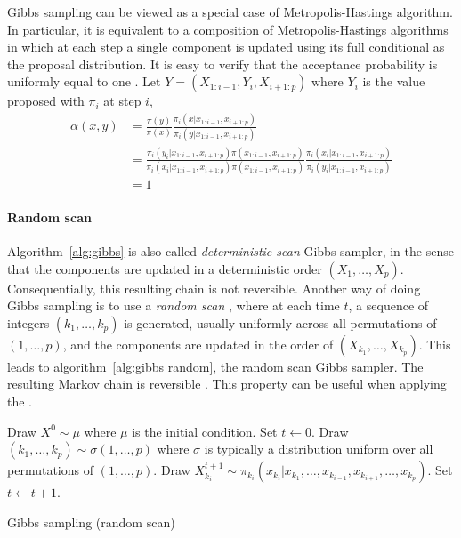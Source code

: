 Gibbs sampling can be viewed as a special case of Metropolis-Hastings
algorithm. In particular, it is equivalent to a composition of
Metropolis-Hastings algorithms in which at each step a single component is
updated using its full conditional as the proposal distribution. It is easy to
verify that the acceptance probability is uniformly equal to one
\cite[][Theorem~10.13]{Robert:2004tn}. Let $Y = (X_{1:i-1},Y_i,X_{i+1:p})$
where $Y_i$ is the value proposed with $\pi_i$ at step $i$,
\begin{align*}
  \alpha(x,y) &= \frac{\pi(y)}{\pi(x)}
  \frac{\pi_i(x|x_{1:i-1},x_{i+1:p})}{\pi_i(y|x_{1:i-1},x_{i+1:p})} \\
  &= \frac{\pi_i(y_i|x_{1:i-1}, x_{i+1:p})\pi(x_{1:i-1},x_{i+1:p})}
  {\pi_i(x_i|x_{1:i-1}, x_{i+1:p})\pi(x_{1:i-1},x_{i+1:p})}
  \frac{\pi_i(x_i|x_{1:i-1}, x_{i+1:p})}{\pi_i(y_i|x_{1:i-1}, x_{i+1:p})} \\
  &= 1
\end{align*}

\paragraph{Random scan}

Algorithm~\ref{alg:gibbs} is also called \emph{deterministic scan} Gibbs
sampler, in the sense that the components are updated in a deterministic order
$(X_1,\dots,X_p)$. Consequentially, this resulting chain is not reversible.
Another way of doing Gibbs sampling is to use a \emph{random scan}
\cite{Liu1995Gibbs}, where at each time $t$, a sequence of integers
$(k_1,\dots,k_p)$ is generated, usually uniformly across all permutations of
$(1,\dots,p)$, and the components are updated in the order of
$(X_{k_1},\dots,X_{k_p})$. This leads to algorithm~\ref{alg:gibbs random}, the
random scan Gibbs sampler. The resulting Markov chain is reversible
\cite{Liu1995Gibbs}. This property can be useful when applying the \clt
\cite[][sec.~10.1.2]{Robert:2004tn}.

\begin{algorithm}
\begin{algorithmic}
  \tophrule
  \STATE Draw $X^0\sim\mu$ where $\mu$ is the initial condition.
  \STATE Set $t\leftarrow0$.
  \REPEAT
    \STATE Draw $(k_1,\dots,k_p)\sim\sigma(1,\dots,p)$ where $\sigma$ is
    typically a distribution uniform over all permutations of $(1,\dots,p)$.
      \STATE Draw
      $X_{k_i}^{t+1}\sim
      \pi_{k_i}(x_{k_i}|x_{k_1},\dots,x_{k_{i-1}},x_{k_{i+1}},\dots,x_{k_p})$.
    \ENDFOR
    \STATE Set $t\leftarrow t+1$.
  \bottomhrule
\end{algorithmic}
\caption{Gibbs sampling (random scan)}
\label{alg:gibbs random}
\end{algorithm}


